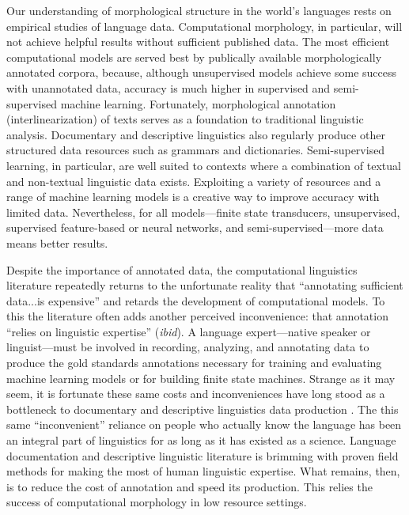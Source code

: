 \documentclass[12pt]{article}
\begin{document}
Our understanding of morphological structure in the world's languages rests on empirical studies of language data. Computational morphology, in particular, will not achieve helpful results without sufficient published data. The most efficient computational models are served best by publically available morphologically annotated corpora, because, although unsupervised models achieve some success with unannotated data, accuracy is much higher in supervised and semi-supervised machine learning. Fortunately, morphological annotation (interlinearization) of texts serves as a foundation to traditional linguistic analysis. Documentary and descriptive linguistics also regularly produce other structured data resources such as grammars and dictionaries. Semi-supervised learning, in particular, are well suited to contexts where a combination of textual and non-textual linguistic data exists. Exploiting a variety of resources and a range of machine learning models is a creative way to improve accuracy with limited data. Nevertheless, for all models—finite state transducers, unsupervised, supervised feature-based or neural networks, and semi-supervised—more data means better results. 

Despite the importance of annotated data, the computational linguistics literature repeatedly returns to the unfortunate reality that ``annotating sufficient data...is expensive'' \cite[page 1954]{cotterell_cross-lingual_2017} and retards the development of computational models. To this the literature often adds another perceived inconvenience: that annotation ``relies on linguistic expertise'' (\textit{ibid}). A language expert—native speaker or linguist—must be involved in recording, analyzing, and annotating data to produce the gold standards annotations necessary for training and evaluating machine learning models or for building finite state machines. Strange as it may seem, it is fortunate these same costs and inconveniences have long stood as a bottleneck to documentary and descriptive linguistics data production \cite{bird_documentary_2015,bettinson_developing_2017,holton_developing_2017}. The this same ``inconvenient'' reliance on people who actually know the language has been an integral part of linguistics for as long as it has existed as a science. Language documentation and descriptive linguistic literature is brimming with proven field methods for making the most of human linguistic expertise. What remains, then, is to reduce the cost of annotation and speed its production. This relies the success of computational morphology in low resource settings.

\newpage



\end{document}
